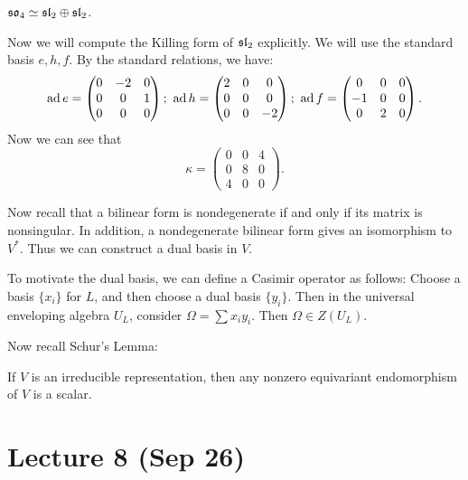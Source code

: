 \documentclass[twoside, 10pt]{article}
\begin{document}
    \begin{prop}
        $\mathfrak{so}_4 \simeq \mathfrak{sl}_2 \oplus \mathfrak{sl}_2$.
    \end{prop}

    Now we will compute the Killing form of $\mathfrak{sl}_2$ explicitly. We will use the standard basis $e,h,f$. By the standard relations, we have:
    \[ \operatorname{ad} e = \begin{pmatrix}
        0 & -2 & 0 \\
        0 & 0 & 1 \\
        0 & 0 & 0
    \end{pmatrix};\ \operatorname{ad} h = \begin{pmatrix}
        2 & 0 & 0 \\
        0 & 0 & 0 \\
        0 & 0 & -2
    \end{pmatrix};\ \operatorname{ad} f = \begin{pmatrix}
        0 & 0 & 0 \\
        -1 & 0 & 0 \\
        0 & 2 & 0
    \end{pmatrix}. \] Now we can see that
    \[ \kappa = \begin{pmatrix}
        0 & 0 & 4 \\
        0 & 8 & 0 \\
        4 & 0 & 0
    \end{pmatrix}.\]

    Now recall that a bilinear form is nondegenerate if and only if its matrix is nonsingular. In addition, a nondegenerate bilinear form gives an isomorphism to $V^*$. Thus we can construct a dual basis in $V$.

    To motivate the dual basis, we can define a Casimir operator as follows: Choose a basis $\{x_i\}$ for $L$, and then choose a dual basis $\{y_i\}$. Then in the universal enveloping algebra $U_L$, consider $\Omega = \sum x_iy_i$. Then $\Omega \in Z(U_L)$.

    Now recall Schur's Lemma:
    \begin{lem}[Schur]
        If $V$ is an irreducible representation, then any nonzero equivariant endomorphism of $V$ is a scalar.
    \end{lem}

    \section{Lecture 8 (Sep 26)}%
    \label{sec:lecture_8_sep_26_}
\end{document}
